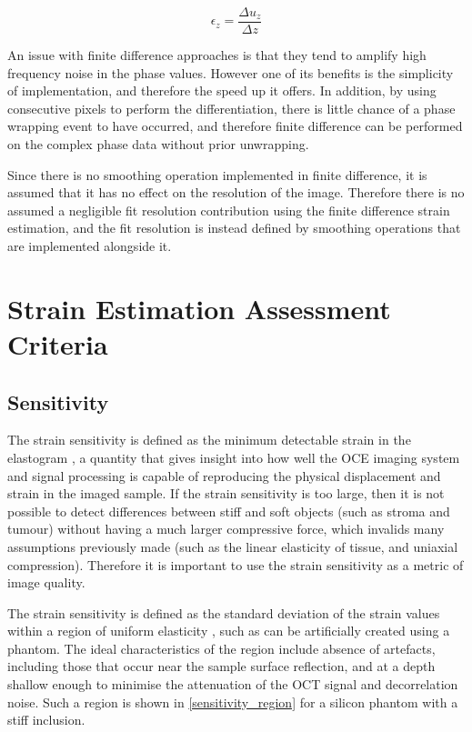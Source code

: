 \begin{equation}
	\label{fd_strain}
	\epsilon_z = \frac{\Delta u_z}{\Delta z}
\end{equation}

An issue with finite difference approaches is that they tend to amplify high frequency noise in the phase values. However one of its benefits is the simplicity of implementation, and therefore the speed up it offers. In addition, by using consecutive pixels to perform the differentiation, there is little chance of a phase wrapping event to have occurred, and therefore finite difference can be performed on the complex phase data without prior unwrapping.

Since there is no smoothing operation implemented in finite difference, it is assumed that it has no effect on the resolution of the image. Therefore there is no assumed a negligible fit resolution contribution using the finite difference strain estimation, and the fit resolution is instead defined by smoothing operations that are implemented alongside it.

\section{Strain Estimation Assessment Criteria}\label{criteria}

\subsection{Sensitivity}
The strain sensitivity is defined as the minimum detectable strain in the elastogram \cite{kennedy_strain_2012}, a quantity that gives insight into how well the OCE imaging system and signal processing is capable of reproducing the physical displacement and strain in the imaged sample. If the strain sensitivity is too large, then it is not possible to detect differences between stiff and soft objects (such as stroma and tumour) without having a much larger compressive force, which invalids many assumptions previously made (such as the linear elasticity of tissue, and uniaxial compression). Therefore it is important to use the strain sensitivity as a metric of image quality. 

The strain sensitivity is defined as the standard deviation of the strain values within a region of uniform elasticity \cite{varghese_theoretical_1997}, such as can be artificially created using a phantom. The ideal characteristics of the region include absence of artefacts, including those that occur near the sample surface reflection, and at a depth shallow enough to minimise the attenuation of the OCT signal and decorrelation noise. Such a region is shown in \autoref{sensitivity_region} for a silicon phantom with a stiff inclusion.


